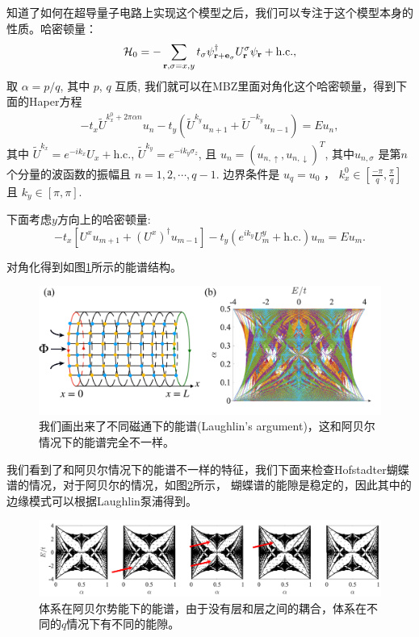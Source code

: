 \documentclass[supercite]{HustGraduPaper}
\begin{document}
知道了如何在超导量子电路上实现这个模型之后，我们可以专注于这个模型本身的性质。哈密顿量：
\begin{equation}
{\mathcal{H}_0} =  - \sum\limits_{{\bf r}, \sigma = x, y} t_\sigma \psi _{{\bf r} + {\bf e}_\sigma }^\dag U_{{\bf r}}^\sigma {\psi _{{\bf r}}} + \text{h.c.}, 
\end{equation}
取 $\alpha=p/q$, 其中 $p$, $q$ 互质, 我们就可以在MBZ里面对角化这个哈密顿量，得到下面的Haper方程
\begin{equation}
\label{Eq:Haper}
\begin{aligned}
- {t_x}{{\tilde U}^{k_x^0 + 2\pi \alpha n}}{u_n} - {t_y}( {{{\tilde U}^{{k_y}}}{u_{n + 1}} + {{\tilde U}^{{-k_y}}}{u_{n - 1}}} )  = Eu_n,
\end{aligned}
\end{equation}	
其中 ${{\tilde U}^{{k_x}}} ={e^{ - i{k_x}}}{U_x} + \text{h.c.}$, $\tilde U ^{k_y} = e^{-ik_y \sigma_z}$, 且 ${u_n} = {\left( {{u_{n, \uparrow }},{u_{n, \downarrow }}} \right)^T}$,
其中$u_{n, \sigma}$ 是第$n$个分量的波函数的振幅且 $n = 1,2,\cdots, q-1$. 边界条件是 $u_{q} = {u_0}$ ， $k_x^0 \in [\frac{-\pi}{q}, \frac{\pi}{q}]$ 且 
$k_y\in [\pi,\pi]$.

下面考虑$y$方向上的哈密顿量:
\begin{equation}
\label{eq: ky}
-t_x[ U^x u_{m+1} + {(U^x)^\dagger} u_{m-1}]-t_y(e^{ik_y}U^y_m + \text{h.c.})u_m = Eu_m.
\end{equation}

对角化得到如图\ref{fig:fig2}所示的能谱结构。
\begin{figure}
	\centering
	\includegraphics[width=1\linewidth]{Figures/topoinsu/fig2}
	\caption{我们画出来了不同磁通下的能谱(Laughlin's argument)，这和阿贝尔情况下的能谱完全不一样。}
	\label{fig:fig2}
\end{figure}

我们看到了和阿贝尔情况下的能谱不一样的特征，我们下面来检查Hofstadter蝴蝶谱的情况，对于阿贝尔的情况，如图\ref{fig:sp4}所示，
蝴蝶谱的能隙是稳定的，因此其中的边缘模式可以根据Laughlin泵浦得到。
\begin{figure}
	\centering
	\includegraphics[width=1\linewidth]{Figures/topoinsu/SP4}
	\caption{体系在阿贝尔势能下的能谱，由于没有层和层之间的耦合，体系在不同的$q$情况下有不同的能隙。}
	\label{fig:sp4}
\end{figure}
\end{document}
